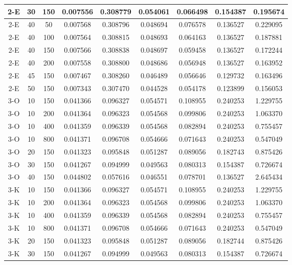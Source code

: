 \begin{center}
\begin{longtable}{|c|c|c|c|c|c|c|c|c|}
	\hline 2-E &	30 &	150	&	0.007556 &	0.308779 &	0.054061 &	0.066498 &	0.154387 &	0.195674 \\
	\hline 2-E &	40 &	50	&	0.007568 &	0.308796 &	0.048694 &	0.076578 &	0.136527 &	0.229095 \\
	\hline 2-E &	40 &	100	&	0.007564 &	0.308815 &	0.048693 &	0.064163 &	0.136527 &	0.187881 \\
	\hline 2-E &	40 &	150	&	0.007566 &	0.308838 &	0.048697 &	0.059458 &	0.136527 &	0.172244 \\
	\hline 2-E &	40 &	200	&	0.007558 &	0.308800 &	0.048686 &	0.056948 &	0.136527 &	0.163952 \\
	\hline 2-E &	45 &	150	&	0.007467 &	0.308260 &	0.046489 &	0.056646 &	0.129732 &	0.163496 \\
	\hline 2-E &	50 &	150	&	0.007343 &	0.307470 &	0.044528 &	0.054178 &	0.123899 &	0.156053 \\
	\hline 3-O &	10 &	150	&	0.041366 &	0.096327 &	0.054571 &	0.108955 &	0.240253 &	1.229755 \\
	\hline 3-O &	10 &	200	&	0.041364 &	0.096323 &	0.054568 &	0.099806 &	0.240253 &	1.063370 \\
	\hline 3-O &	10 &	400	&	0.041359 &	0.096339 &	0.054568 &	0.082894 &	0.240253 &	0.755457 \\
	\hline \rowcolor{bad} 3-O &	10 &	800	&	0.041371 &	0.096708 &	0.054666 &	0.071643 &	0.240253 &	0.547049 \\
	\hline 3-O &	20 &	150	&	0.041323 &	0.095848 &	0.051287 &	0.089056 &	0.182743 &	0.875426 \\
	\hline 3-O &	30 &	150	&	0.041267 &	0.094999 &	0.049563 &	0.080313 &	0.154387 &	0.726674 \\
	\hline \rowcolor{bad} 3-O &	40 &	150	&	0.044802 &	0.057616 &	0.046551 &	0.078701 &	0.136527 &	2.645434 \\
	\hline 3-K &	10 &	150	&	0.041366 &	0.096327 &	0.054571 &	0.108955 &	0.240253 &	1.229755 \\
	\hline 3-K &	10 &	200	&	0.041364 &	0.096323 &	0.054568 &	0.099806 &	0.240253 &	1.063370 \\
	\hline 3-K &	10 &	400	&	0.041359 &	0.096339 &	0.054568 &	0.082894 &	0.240253 &	0.755457 \\
	\hline \rowcolor{bad} 3-K &	10 &	800	&	0.041371 &	0.096708 &	0.054666 &	0.071643 &	0.240253 &	0.547049 \\
	\hline 3-K &	20 &	150	&	0.041323 &	0.095848 &	0.051287 &	0.089056 &	0.182744 &	0.875426 \\
	\hline 3-K &	30 &	150	&	0.041267 &	0.094999 &	0.049563 &	0.080313 &	0.154387 &	0.726674 \\

\end{longtable}
\end{center}
